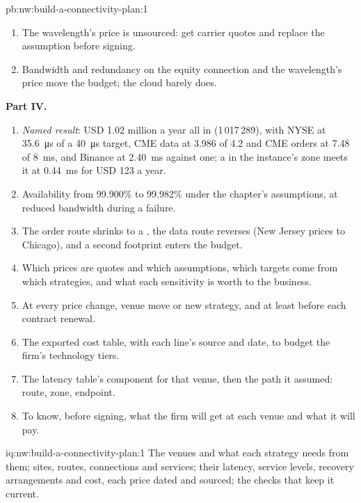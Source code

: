 \begin{solution}{pb:nw:build-a-connectivity-plan:1}
\begin{enumerate}[resume]
\item The wavelength's price is unsourced: get carrier quotes and replace the assumption before signing.
\item Bandwidth and redundancy on the equity connection and the wavelength's price move the budget; the cloud barely does.
\end{enumerate}
\textbf{Part IV.}
\begin{enumerate}[resume]
\item \emph{Named result}: USD 1.02 million a year all in (1\,017\,289), with NYSE at \qty{35.6}{\micro\second} of a
  \qty{40}{\micro\second} target, CME data at 3.986 of 4.2 and CME orders at 7.48 of \qty{8}{\milli\second}, and Binance at
  \qty{2.40}{\milli\second} against one; a  in the instance's zone meets it at \qty{0.44}{\milli\second} for USD 123 a year.
\item Availability from 99.900\% to 99.982\% under the chapter's assumptions, at reduced bandwidth during a failure.
\item The order route shrinks to a , the data route reverses (New Jersey prices to Chicago), and a second 
  footprint enters the budget.
\item Which prices are quotes and which assumptions, which targets come from which strategies, and what each sensitivity is worth to the
  business.
\item At every price change, venue move or new strategy, and at least before each contract renewal.
\item The exported cost table, with each line's source and date, to budget the firm's technology tiers.
\item The latency table's component for that venue, then the path it assumed: route, zone, endpoint.
\item To know, before signing, what the firm will get at each venue and what it will pay.
\end{enumerate}
\end{solution}

\begin{solution}{iq:nw:build-a-connectivity-plan:1}
The venues and what each strategy needs from them; sites, routes, connections and services; their latency, service levels, recovery
arrangements and cost, each price dated and sourced; the checks that keep it current.
\end{solution}

